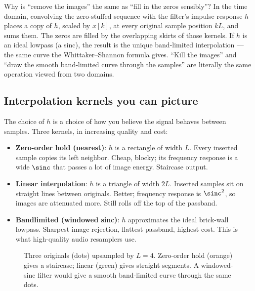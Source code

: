 \begin{whybox}
Why is ``remove the images'' the same as ``fill in the zeros sensibly''? In the
time domain, convolving the zero-stuffed sequence with the filter's impulse
response $h$ places a copy of $h$, scaled by $x[k]$, at every original sample
position $kL$, and sums them. The zeros are filled by the overlapping skirts of
those kernels. If $h$ is an ideal lowpass (a sinc), the result is the unique
band-limited interpolation --- the same curve the Whittaker--Shannon formula
gives. ``Kill the images'' and ``draw the smooth band-limited curve through the
samples'' are literally the same operation viewed from two domains.
\end{whybox}

\subsection{Interpolation kernels you can picture}

The choice of $h$ is a choice of how you believe the signal behaves between
samples. Three kernels, in increasing quality and cost:
\begin{itemize}
  \item \textbf{Zero-order hold (nearest)}: $h$ is a rectangle of width $L$. Every
  inserted sample copies its left neighbor. Cheap, blocky; its frequency response
  is a wide $\sinc$ that passes a lot of image energy. Staircase output.
  \item \textbf{Linear interpolation}: $h$ is a triangle of width $2L$. Inserted
  samples sit on straight lines between originals. Better; frequency response is
  $\sinc^2$, so images are attenuated more. Still rolls off the top of the
  passband.
  \item \textbf{Bandlimited (windowed sinc)}: $h$ approximates the ideal
  brick-wall lowpass. Sharpest image rejection, flattest passband, highest cost.
  This is what high-quality audio resamplers use.
\end{itemize}

\begin{figure}[H]
\centering
{}
\caption{Three originals (dots) upsampled by $L=4$. Zero-order hold (orange)
gives a staircase; linear (green) gives straight segments. A windowed-sinc filter
would give a smooth band-limited curve through the same dots.}
\label{ch22:fig-kernels}
\end{figure}

